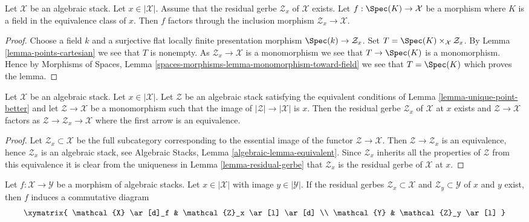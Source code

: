 \begin{lemma}
\label{lemma-residual-gerbe-points}
Let $\mathcal{X}$ be an algebraic stack. Let $x \in |\mathcal{X}|$.
Assume that the residual gerbe $\mathcal{Z}_x$ of $\mathcal{X}$ exists.
Let $f : \Spec(K) \to \mathcal{X}$ be a morphism where $K$ is a field
in the equivalence class of $x$. Then $f$ factors through the inclusion
morphism $\mathcal{Z}_x \to \mathcal{X}$.
\end{lemma}

\begin{proof}
Choose a field $k$ and a surjective flat locally finite presentation
morphism $\Spec(k) \to \mathcal{Z}_x$. Set
$T = \Spec(K) \times_\mathcal{X} \mathcal{Z}_x$. By
Lemma \ref{lemma-points-cartesian}
we see that $T$ is nonempty. As $\mathcal{Z}_x \to \mathcal{X}$
is a monomorphism we see that $T \to \Spec(K)$ is a monomorphism.
Hence by
Morphisms of Spaces, Lemma
\ref{spaces-morphisms-lemma-monomorphism-toward-field}
we see that $T = \Spec(K)$ which proves the lemma.
\end{proof}

\begin{lemma}
\label{lemma-residual-gerbe-unique}
Let $\mathcal{X}$ be an algebraic stack. Let $x \in |\mathcal{X}|$.
Let $\mathcal{Z}$ be an algebraic stack satisfying the equivalent conditions of
Lemma \ref{lemma-unique-point-better}
and let $\mathcal{Z} \to \mathcal{X}$ be a monomorphism such that the image
of $|\mathcal{Z}| \to |\mathcal{X}|$ is $x$. Then the residual gerbe
$\mathcal{Z}_x$ of $\mathcal{X}$ at $x$ exists and
$\mathcal{Z} \to \mathcal{X}$ factors as
$\mathcal{Z} \to \mathcal{Z}_x \to \mathcal{X}$ where the first arrow
is an equivalence.
\end{lemma}

\begin{proof}
Let $\mathcal{Z}_x \subset \mathcal{X}$ be the full subcategory corresponding
to the essential image of the functor $\mathcal{Z} \to \mathcal{X}$.
Then $\mathcal{Z} \to \mathcal{Z}_x$ is an equivalence, hence
$\mathcal{Z}_x$ is an algebraic stack, see
Algebraic Stacks, Lemma \ref{algebraic-lemma-equivalent}.
Since $\mathcal{Z}_x$ inherits all the properties of $\mathcal{Z}$ from
this equivalence it is clear from the uniqueness in
Lemma \ref{lemma-residual-gerbe}
that $\mathcal{Z}_x$ is the residual gerbe of $\mathcal{X}$ at $x$.
\end{proof}

\begin{lemma}
\label{lemma-residual-gerbe-functorial}
Let $f : \mathcal{X} \to \mathcal{Y}$ be a morphism of algebraic stacks.
Let $x \in |\mathcal{X}|$ with image $y \in |\mathcal{Y}|$.
If the residual gerbes $\mathcal{Z}_x \subset \mathcal{X}$
and $\mathcal{Z}_y \subset \mathcal{Y}$ of $x$ and $y$ exist,
then $f$ induces a commutative diagram
$$
\xymatrix{
\mathcal{X} \ar[d]_f & \mathcal{Z}_x \ar[l] \ar[d] \\
\mathcal{Y} & \mathcal{Z}_y \ar[l]
}
$$
\end{lemma}

